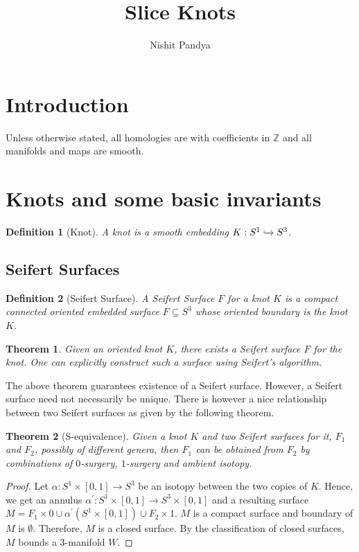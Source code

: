 \documentclass{article}[10pt]
\title{Slice Knots}
\author{Nishit Pandya}
\date{}
\newtheorem{defn}{Definition}[subsection]
\newtheorem{theorem}{Theorem}[subsection]
\begin{document}
\maketitle
\tableofcontents

\section{Introduction}
Unless otherwise stated, all homologies are with coefficients  in $\mathbb{Z}$ and all manifolds and maps are smooth.

\section{Knots and some basic invariants}
\begin{defn}[Knot]
\label{defKnot}
A knot is a smooth embedding $K : S^{1} \xhookrightarrow{} S^{3}$.
\end{defn}

\subsection{Seifert Surfaces}
\begin{defn}[Seifert Surface]
\label{defSeifertSurface}
A Seifert Surface $F$ for a knot $K$ is a compact connected oriented embedded surface $F \subseteq S^3$ whose oriented boundary is the knot $K$.
\end{defn}

\begin{theorem}
\label{thmSeifSurfExist}
Given an oriented knot $K$, there exists a Seifert surface $F$ for the knot. One can explicitly construct such a surface using Seifert's algorithm.
\end{theorem}
The above theorem guarantees existence of a Seifert surface. However, a Seifert surface need not necessarily be unique. There is however a nice relationship between two Seifert surfaces as given by the following theorem.

\begin{theorem}[S-equivalence]
\label{thmS-equivalence}
Given a knot $K$ and two Seifert surfaces for it, $F_{1}$ and $F_{2}$, possibly of different genera, then $F_{1}$ can be obtained from $F_{2}$ by combinations of $0$-surgery, $1$-surgery and ambient isotopy.
\end{theorem}

\begin{proof}
Let $\alpha:S^{1}\times[0,1] \to S^{3}$ be an isotopy between the two copies of $K$. Hence, we get an annulus $\alpha^\prime:S^{1}\times[0,1]\to S^{3}\times[0,1]$ and a resulting surface $M = F_{1}\times0 \cup \alpha^\prime(S^{1}\times[0,1]) \cup F_{2}\times1$. $M$ is a compact surface and boundary of $M$ is $\emptyset$. Therefore, $M$ is a closed surface. By the classification of closed surfaces, $M$ bounds a 3-manifold $W$.
\end{proof}
\end{document}
